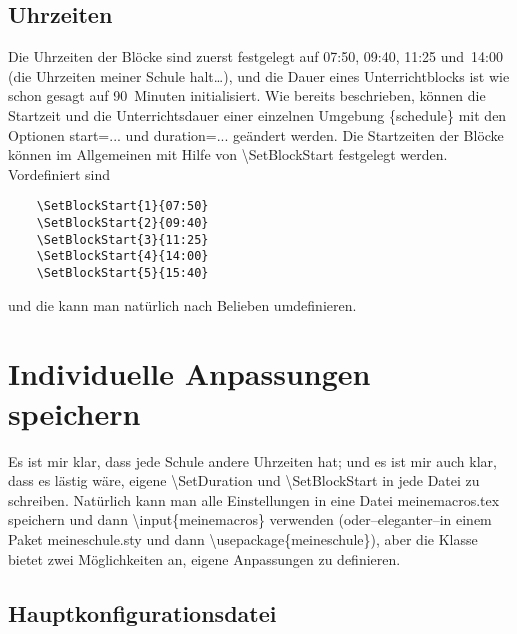 \documentclass[hyperworksheet]{drcschool}
\newcommand*{\cs}[1]{\textup{\ttfamily\textbackslash#1}}                   %
\newcommand*{\opt}[1]{\textup{\ttfamily#1}}                                %
\newcommand*{\env}[1]{\textup{\ttfamily\{#1\}}}                            %
\begin{document}
\subsection{Uhrzeiten}
Die Uhrzeiten der Blöcke sind zuerst festgelegt auf 07:50, 09:40, 11:25 und~14:00
(die Uhrzeiten meiner Schule halt\ldots), und die Dauer eines Unterrichtblocks ist
wie schon gesagt auf 90~Minuten initialisiert. Wie bereits beschrieben, können die Startzeit
und die Unterrichtsdauer einer einzelnen Umgebung \env{schedule} mit den Optionen \opt{start=...}
und \opt{duration=...} geändert werden. Die Startzeiten der Blöcke können im Allgemeinen
mit Hilfe von \cs{SetBlockStart} festgelegt werden. Vordefiniert sind
\begin{verbatim}
    \SetBlockStart{1}{07:50}
    \SetBlockStart{2}{09:40}
    \SetBlockStart{3}{11:25}
    \SetBlockStart{4}{14:00}
    \SetBlockStart{5}{15:40}
\end{verbatim}
und die kann man natürlich nach Belieben umdefinieren.

\section{Individuelle Anpassungen speichern}\label{sec:anpassungen}
Es ist mir klar, dass jede Schule andere Uhrzeiten hat; und es ist mir auch klar,
dass es lästig wäre, eigene \cs{SetDuration} und \cs{SetBlockStart} in jede
Datei zu schreiben. Natürlich kann man alle Einstellungen in eine Datei \opt{meinemacros.tex}
speichern und dann \cs{input\{meinemacros\}} verwenden
(oder--eleganter--in einem Paket \opt{meineschule.sty} und dann \cs{usepackage\{meineschule\}}),
aber die Klasse bietet zwei
Möglichkeiten an, eigene Anpassungen zu definieren.

\subsection{Hauptkonfigurationsdatei}
\end{document}
